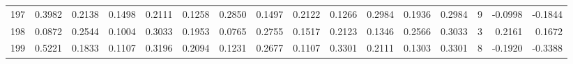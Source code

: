 \begin{tabular}{lrrrrrrrrrrrrrrr}
197 &      0.3982 &  0.2138 &  0.1498 &  0.2111 &  0.1258 &  0.2850 &  0.1497 &  0.2122 &  0.1266 &  0.2984 &   0.1936 &     0.2984 &      9 &                   -0.0998 &                    -0.1844 \\
198 &      0.0872 &  0.2544 &  0.1004 &  0.3033 &  0.1953 &  0.0765 &  0.2755 &  0.1517 &  0.2123 &  0.1346 &   0.2566 &     0.3033 &      3 &                    0.2161 &                     0.1672 \\
199 &      0.5221 &  0.1833 &  0.1107 &  0.3196 &  0.2094 &  0.1231 &  0.2677 &  0.1107 &  0.3301 &  0.2111 &   0.1303 &     0.3301 &      8 &                   -0.1920 &                    -0.3388 \\
\bottomrule
\end{tabular}
